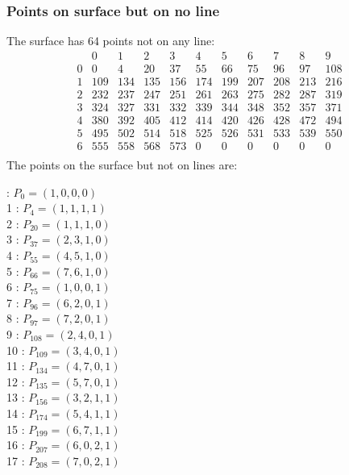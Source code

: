 \documentclass{article}
\begin{document}
{\subsubsection*{Points on surface but on no line}
The surface has 64 points not on any line:\\
$$
\begin{array}{r|*{10}{r}}
 & 0 & 1 & 2 & 3 & 4 & 5 & 6 & 7 & 8 & 9\\
\hline
0 & 0 & 4 & 20 & 37 & 55 & 66 & 75 & 96 & 97 & 108\\
1 & 109 & 134 & 135 & 156 & 174 & 199 & 207 & 208 & 213 & 216\\
2 & 232 & 237 & 247 & 251 & 261 & 263 & 275 & 282 & 287 & 319\\
3 & 324 & 327 & 331 & 332 & 339 & 344 & 348 & 352 & 357 & 371\\
4 & 380 & 392 & 405 & 412 & 414 & 420 & 426 & 428 & 472 & 494\\
5 & 495 & 502 & 514 & 518 & 525 & 526 & 531 & 533 & 539 & 550\\
6 & 555 & 558 & 568 & 573 & 0 & 0 & 0 & 0 & 0 & 0\\
\end{array}
$$
The points on the surface but not on lines are:\\
\begin{multicols}{2}
 : $P_{0}=( 1, 0, 0, 0 )$\\
1 : $P_{4}=( 1, 1, 1, 1 )$\\
2 : $P_{20}=( 1, 1, 1, 0 )$\\
3 : $P_{37}=( 2, 3, 1, 0 )$\\
4 : $P_{55}=( 4, 5, 1, 0 )$\\
5 : $P_{66}=( 7, 6, 1, 0 )$\\
6 : $P_{75}=( 1, 0, 0, 1 )$\\
7 : $P_{96}=( 6, 2, 0, 1 )$\\
8 : $P_{97}=( 7, 2, 0, 1 )$\\
9 : $P_{108}=( 2, 4, 0, 1 )$\\
10 : $P_{109}=( 3, 4, 0, 1 )$\\
11 : $P_{134}=( 4, 7, 0, 1 )$\\
12 : $P_{135}=( 5, 7, 0, 1 )$\\
13 : $P_{156}=( 3, 2, 1, 1 )$\\
14 : $P_{174}=( 5, 4, 1, 1 )$\\
15 : $P_{199}=( 6, 7, 1, 1 )$\\
16 : $P_{207}=( 6, 0, 2, 1 )$\\
17 : $P_{208}=( 7, 0, 2, 1 )$\\

\end{multicols}}
\end{document}
